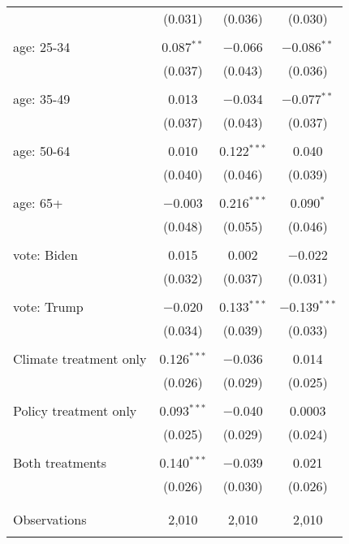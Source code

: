 \begin{tabular}{@{\extracolsep{5pt}}lccc}
  & (0.031) & (0.036) & (0.030) \\ 
  & & & \\ 
 age: 25-34 & 0.087$^{**}$ & $-$0.066 & $-$0.086$^{**}$ \\ 
  & (0.037) & (0.043) & (0.036) \\ 
  & & & \\ 
 age: 35-49 & 0.013 & $-$0.034 & $-$0.077$^{**}$ \\ 
  & (0.037) & (0.043) & (0.037) \\ 
  & & & \\ 
 age: 50-64 & 0.010 & 0.122$^{***}$ & 0.040 \\ 
  & (0.040) & (0.046) & (0.039) \\ 
  & & & \\ 
 age: 65+ & $-$0.003 & 0.216$^{***}$ & 0.090$^{*}$ \\ 
  & (0.048) & (0.055) & (0.046) \\ 
  & & & \\ 
 vote: Biden & 0.015 & 0.002 & $-$0.022 \\ 
  & (0.032) & (0.037) & (0.031) \\ 
  & & & \\ 
 vote: Trump & $-$0.020 & 0.133$^{***}$ & $-$0.139$^{***}$ \\ 
  & (0.034) & (0.039) & (0.033) \\ 
  & & & \\ 
 Climate treatment only & 0.126$^{***}$ & $-$0.036 & 0.014 \\ 
  & (0.026) & (0.029) & (0.025) \\ 
  & & & \\ 
 Policy treatment only & 0.093$^{***}$ & $-$0.040 & 0.0003 \\ 
  & (0.025) & (0.029) & (0.024) \\ 
  & & & \\ 
 Both treatments & 0.140$^{***}$ & $-$0.039 & 0.021 \\ 
  & (0.026) & (0.030) & (0.026) \\ 
  & & & \\ 
\hline \\[-1.8ex] 

Observations & 2,010 & 2,010 & 2,010 \\ 
\hline 
\hline \\[-1.8ex] 
\end{tabular} 